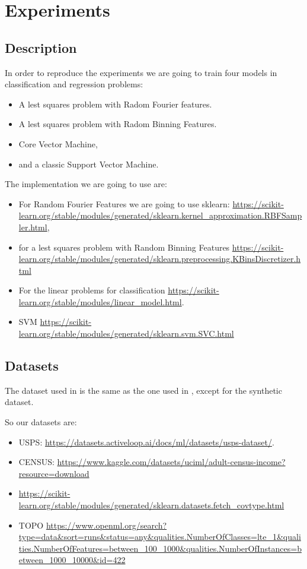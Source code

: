 \chapter{Experiments}

\section{Description}

In order to reproduce the experiments we are going to train 
four models in classification and regression problems: 

\begin{itemize}
    \item A lest squares problem with Radom Fourier features. 
    \item A lest squares problem with Radom Binning Features. 
    \item Core Vector Machine,
    \item and a classic Support Vector Machine. 
\end{itemize}

The implementation we are going to use are: 
\begin{itemize}
    \item For Random Fourier Features we are going to use sklearn: 
\url{https://scikit-learn.org/stable/modules/generated/sklearn.kernel_approximation.RBFSampler.html}, 
\item  for a lest squares problem with Random Binning Features \url{https://scikit-learn.org/stable/modules/generated/sklearn.preprocessing.KBinsDiscretizer.html}
\item  For the linear problems for classification \url{https://scikit-learn.org/stable/modules/linear_model.html}. 

\item SVM \url{https://scikit-learn.org/stable/modules/generated/sklearn.svm.SVC.html}
\end{itemize}

\section*{Datasets}
The dataset used in \cite{Random_Features_for_Large-Scale_Kernel_Machines} is the same as the one used in \cite{Tsang2005CoreVM}, except for the synthetic dataset.

So our datasets are: 

\begin{itemize}
    \item USPS: \url{https://datasets.activeloop.ai/docs/ml/datasets/usps-dataset/}. 
    \item CENSUS: \url{https://www.kaggle.com/datasets/uciml/adult-census-income?resource=download}
    \item \url{https://scikit-learn.org/stable/modules/generated/sklearn.datasets.fetch_covtype.html}
    \item TOPO \url{https://www.openml.org/search?type=data&sort=runs&status=any&qualities.NumberOfClasses=lte_1&qualities.NumberOfFeatures=between_100_1000&qualities.NumberOfInstances=between_1000_10000&id=422}
    
\end{itemize}

